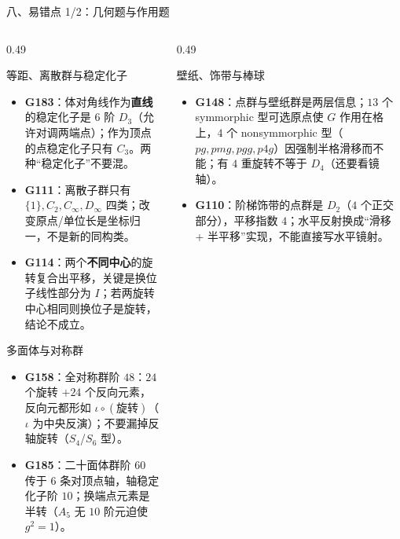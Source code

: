 \documentclass[aspectratio=169,10pt,fontset=none]{ctexbeamer}
\newcommand{\ex}[1]{\textcolor{accent}{\footnotesize\bfseries #1}}
\begin{document}
\begin{frame}[t]{八、易错点 1/2：几何题与作用题}
  \label{sec:pitfalls1}
  \begin{columns}[T,onlytextwidth]
    \begin{column}{0.49\textwidth}
      \begin{alertblock}{\footnotesize 等距、离散群与稳定化子}
        \scriptsize
        \begin{itemize}\setlength{\itemsep}{1pt}
          \item \ex{G183}：体对角线作为\textbf{直线}的稳定化子是 $6$ 阶 $D_3$（允许对调两端点）；作为顶点的点稳定化子只有 $C_3$。两种“稳定化子”不要混。
          \item \ex{G111}：离散子群只有 $\{1\},C_2,C_\infty,D_\infty$ 四类；改变原点/单位长是坐标归一，不是新的同构类。
          \item \ex{G114}：两个\textbf{不同中心}的旋转复合出平移，关键是换位子线性部分为 $I$；若两旋转中心相同则换位子是旋转，结论不成立。
        \end{itemize}
      \end{alertblock}
      \begin{alertblock}{\footnotesize 多面体与对称群}
        \scriptsize
        \begin{itemize}\setlength{\itemsep}{1pt}
          \item \ex{G158}：全对称群阶 $48$：$24$ 个旋转 $+24$ 个反向元素，反向元都形如 $\iota\circ(\text{旋转})$（$\iota$ 为中央反演）；不要漏掉反轴旋转（$S_4$/$S_6$ 型）。
          \item \ex{G185}：二十面体群阶 $60$ 传于 $6$ 条对顶点轴，轴稳定化子阶 $10$；换端点元素是半转（$A_5$ 无 $10$ 阶元迫使 $g^2=1$）。
        \end{itemize}
      \end{alertblock}
    \end{column}
    \begin{column}{0.49\textwidth}
      \begin{alertblock}{\footnotesize 壁纸、饰带与棒球}
        \scriptsize
        \begin{itemize}\setlength{\itemsep}{1pt}
          \item \ex{G148}：点群与壁纸群是两层信息；$13$ 个 symmorphic 型可选原点使 $G$ 作用在格上，$4$ 个 nonsymmorphic 型（$pg,pmg,pgg,p4g$）因强制半格滑移而不能；有 $4$ 重旋转不等于 $D_4$（还要看镜轴）。
          \item \ex{G110}：阶梯饰带的点群是 $D_2$（$4$ 个正交部分），平移指数 $4$；水平反射换成“滑移 + 半平移”实现，不能直接写水平镜射。

\end{itemize}
\end{alertblock}
\end{column}
\end{columns}
\end{frame}
\end{document}
